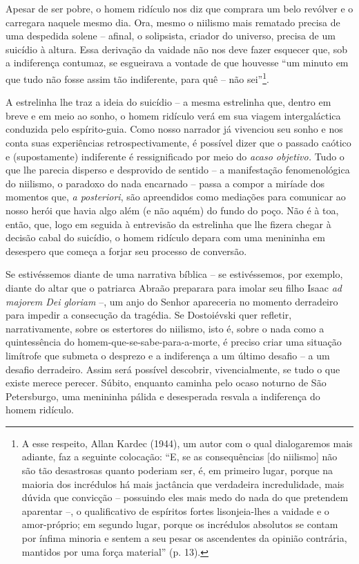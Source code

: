 Apesar de ser pobre, o homem ridículo nos diz que comprara um belo
revólver e o carregara naquele mesmo dia. Ora, mesmo o niilismo mais
rematado precisa de uma despedida solene -- afinal, o solipsista,
criador do universo, precisa de um suicídio à altura. Essa derivação da
vaidade não nos deve fazer esquecer que, sob a indiferença contumaz, se
esgueirava a vontade de que houvesse ``um minuto em que tudo não fosse
assim tão indiferente, para quê -- não sei''\footnote{A esse respeito,
  Allan Kardec (1944), um autor com o qual dialogaremos mais adiante,
  faz a seguinte colocação: ``E, se as consequências {[}do niilismo{]}
  não são tão desastrosas quanto poderiam ser, é, em primeiro lugar,
  porque na maioria dos incrédulos há mais jactância que verdadeira
  incredulidade, mais dúvida que convicção -- possuindo eles mais medo
  do nada do que pretendem aparentar --, o qualificativo de espíritos
  fortes lisonjeia-lhes a vaidade e o amor-próprio; em segundo lugar,
  porque os incrédulos absolutos se contam por ínfima minoria e sentem a
  seu pesar os ascendentes da opinião contrária, mantidos por uma força
  material'' (p. 13).}.

A estrelinha lhe traz a ideia do suicídio -- a mesma estrelinha que,
dentro em breve e em meio ao sonho, o homem ridículo verá em sua viagem
intergaláctica conduzida pelo espírito-guia. Como nosso narrador já
vivenciou seu sonho e nos conta suas experiências retrospectivamente, é
possível dizer que o passado caótico e (supostamente) indiferente é
ressignificado por meio do \emph{acaso objetivo.} Tudo o que lhe parecia
disperso e desprovido de sentido -- a manifestação fenomenológica do
niilismo, o paradoxo do nada encarnado -- passa a compor a miríade dos
momentos que, \emph{a posteriori}, são apreendidos como mediações para
comunicar ao nosso herói que havia algo além (e não aquém) do fundo do
poço. Não é à toa, então, que, logo em seguida à entrevisão da
estrelinha que lhe fizera chegar à decisão cabal do suicídio, o homem
ridículo depara com uma menininha em desespero que começa a forjar seu
processo de conversão.

Se estivéssemos diante de uma narrativa bíblica -- se estivéssemos, por
exemplo, diante do altar que o patriarca Abraão preparara para imolar
seu filho Isaac \emph{ad majorem Dei gloriam} --, um anjo do Senhor
apareceria no momento derradeiro para impedir a consecução da tragédia.
Se Dostoiévski quer refletir, narrativamente, sobre os estertores do
niilismo, isto é, sobre o nada como a quintessência do
homem-que-se-sabe-para-a-morte, é preciso criar uma situação limítrofe
que submeta o desprezo e a indiferença a um último desafio -- a um
desafio derradeiro. Assim será possível descobrir, vivencialmente, se
tudo o que existe merece perecer. Súbito, enquanto caminha pelo ocaso
noturno de São Petersburgo, uma menininha pálida e desesperada resvala a
indiferença do homem ridículo.

